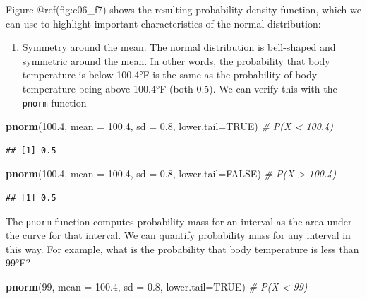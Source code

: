 \documentclass[
]{book}
\newenvironment{Shaded}{\begin{snugshade}}{\end{snugshade}}
\newcommand{\AttributeTok}[1]{\textcolor[rgb]{0.13,0.29,0.53}{#1}}
\newcommand{\CommentTok}[1]{\textcolor[rgb]{0.56,0.35,0.01}{\textit{#1}}}
\newcommand{\ConstantTok}[1]{\textcolor[rgb]{0.56,0.35,0.01}{#1}}
\newcommand{\DecValTok}[1]{\textcolor[rgb]{0.00,0.00,0.81}{#1}}
\newcommand{\FloatTok}[1]{\textcolor[rgb]{0.00,0.00,0.81}{#1}}
\newcommand{\FunctionTok}[1]{\textcolor[rgb]{0.13,0.29,0.53}{\textbf{#1}}}
\newcommand{\NormalTok}[1]{#1}
\providecommand{\tightlist}{%
  \setlength{\itemsep}{0pt}\setlength{\parskip}{0pt}}
\begin{document}
Figure @ref(fig:c06\_f7) shows the resulting probability density function, which we can use to highlight important characteristics of the normal distribution:

\begin{enumerate}
\def\labelenumi{\arabic{enumi}.}
\tightlist
\item
  Symmetry around the mean. The normal distribution is bell-shaped and symmetric around the mean. In other words, the probability that body temperature is below 100.4°F is the same as the probability of body temperature being above 100.4°F (both 0.5). We can verify this with the \texttt{pnorm} function
\end{enumerate}

\begin{Shaded}
\begin{Highlighting}[]
\FunctionTok{pnorm}\NormalTok{(}\FloatTok{100.4}\NormalTok{, }\AttributeTok{mean =} \FloatTok{100.4}\NormalTok{, }\AttributeTok{sd =} \FloatTok{0.8}\NormalTok{, }\AttributeTok{lower.tail=}\ConstantTok{TRUE}\NormalTok{) }\CommentTok{\# P(X \textless{} 100.4)}
\end{Highlighting}
\end{Shaded}

\begin{verbatim}
## [1] 0.5
\end{verbatim}

\begin{Shaded}
\begin{Highlighting}[]
\FunctionTok{pnorm}\NormalTok{(}\FloatTok{100.4}\NormalTok{, }\AttributeTok{mean =} \FloatTok{100.4}\NormalTok{, }\AttributeTok{sd =} \FloatTok{0.8}\NormalTok{, }\AttributeTok{lower.tail=}\ConstantTok{FALSE}\NormalTok{) }\CommentTok{\# P(X \textgreater{} 100.4)}
\end{Highlighting}
\end{Shaded}

\begin{verbatim}
## [1] 0.5
\end{verbatim}

The \texttt{pnorm} function computes probability mass for an interval as the area under the curve for that interval. We can quantify probability mass for any interval in this way. For example, what is the probability that body temperature is less than 99°F?

\begin{Shaded}
\begin{Highlighting}[]
\FunctionTok{pnorm}\NormalTok{(}\DecValTok{99}\NormalTok{, }\AttributeTok{mean =} \FloatTok{100.4}\NormalTok{, }\AttributeTok{sd =} \FloatTok{0.8}\NormalTok{, }\AttributeTok{lower.tail=}\ConstantTok{TRUE}\NormalTok{) }\CommentTok{\# P(X \textless{} 99)}
\end{Highlighting}
\end{Shaded}
\end{document}
